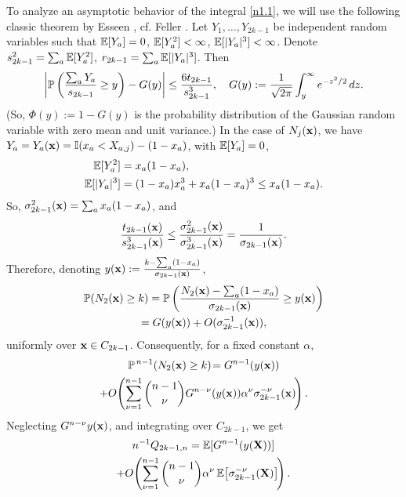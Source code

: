 \documentclass[11pt]{amsart}
\def\a{\alpha}
\theoremstyle{remark}
\numberwithin{equation}{section}
\begin{document}
To analyze an asymptotic behavior of the integral \eqref{n1.1}, we will use the following classic theorem by Esseen \cite{Ess}, cf. Feller \cite{Fel}. Let $Y_1,\dots, Y_{2k-1}$ be independent random variables such that $\Bbb E[Y_a]=0$, $\Bbb E[Y_a^2]<\infty$, $\Bbb E[|Y_a|^3]<\infty$. Denote $s_{2k-1}^2=\sum_a \Bbb E[Y_a^2]$, $r_{2k-1}=\sum_a \Bbb E[|Y_a|^3]$. Then 
\begin{align*}
\left|\Bbb P\left(\frac{\sum_a Y_a}{s_{2k-1}}\ge y\right)-G(y)\right|
\le \frac{6t_{2k-1}}{s_{2k-1}^3},\quad G(y):=\frac{1}{\sqrt{2\pi}}\int_y^{\infty} e^{-z^2/2}\,dz.\\
\end{align*}
(So, $\Phi(y):=1-G(y)$ is the probability distribution of the Gaussian random variable with zero mean and unit variance.) In the case of $N_j(\bold x)$, we have $Y_a=Y_a(\bold x)=\Bbb I(x_a< X_{a,j})-(1-x_a)$, with $\Bbb E[Y_a]=0$,
\begin{align*}
\Bbb E[Y_a^2]&=x_a(1-x_a),\\
\Bbb E[|Y_a|^3]&=(1-x_a)x_a^3+x_a(1-x_a)^3\le x_a(1-x_a).
\end{align*}
So, $\sigma^2_{2k-1}(\bold x)=\sum_a x_a(1-x_a)$, and 
\[
\frac{t_{2k-1}(\bold x)}{s_{2k-1}^3(\bold x)}\le \frac{\sigma^2_{2k-1}(\bold x)}{\sigma_{2k-1}^3(\bold x)}=\frac{1}
{\sigma_{2k-1}(\bold x)}.
\]
Therefore, denoting $y(\bold x):=\frac{k-\sum_a (1-x_a)}{\sigma_{2k-1}(\bold x)}$,
\begin{multline*}
\Bbb P(N_2(\bold x)\ge k)=\Bbb P\left(\frac{N_2(\bold x)-\sum_a (1-x_a)}{\sigma_{2k-1}(\bold x)}\ge
y(\bold x)\right)\\
= G(y(\bold x))+O(\sigma_{2k-1}^{-1}(\bold x)),
\end{multline*}
uniformly over $\bold x\in C_{2k-1}$. Consequently, for a fixed constant $\a$,
\begin{multline*}
\Bbb P^{\,n-1}(N_2(\bold x)\ge k)\!=G^{n-1}(y(\bold x))\\
+O\!\left(\sum_{\nu=1}^{n-1}\binom{n-1}{\nu}G^{n-\nu}(y(\bold x)) \a^{\nu}\sigma^{-\nu}_{2k-1}(\bold x)\!\right).
\end{multline*}
Neglecting $G^{n-\nu}y(\bold x)$, and integrating over $C_{2k-1}$, we get
\begin{multline}\label{n1.11}
n^{-1}Q_{2k-1,n}=\Bbb E[G^{n-1}(y(\bold X))]\\
+O\!\left(\sum_{\nu=1}^{n-1}\binom{n-1}{\nu}\a^{\nu}\,\Bbb E\bigl[\sigma^{-\nu}_{2k-1}(\bold X)
\bigr]\!\right).
\end{multline}
\end{document}
